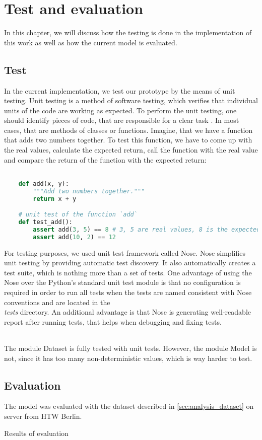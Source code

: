 \chapter{Test and evaluation}
In this chapter, we will discuss how the testing is done
in the implementation of this work as well as how
the current model is evaluated.
\section{Test}
In the current implementation, we test our prototype by the means
of unit testing. Unit testing is a method of software testing,
which verifies that individual units of the code are working
as expected. To perform the unit testing, one should identify
pieces of code, that are responsible for a clear task \cite{Huizinga2007}.
In most cases,
that are methods of classes or functions. Imagine, that we have
a function that adds two numbers together. To test this function,
we have to come up with the real values, calculate the expected
return, call the function with the real value and compare
the return of the function with the expected return:

\begin{lstlisting}[language=Python, caption={TensorFlow example \cite{tensorflow2015-whitepaper}},label={list:test_ex}]

	def add(x, y):
		"""Add two numbers together."""
		return x + y

	# unit test of the function `add`
	def test_add():
		assert add(3, 5) == 8 # 3, 5 are real values, 8 is the expected return
		assert add(10, 2) == 12
\end{lstlisting}

For testing purposes, we
used unit test framework called Nose. Nose simplifies unit testing
by providing automatic test discovery. It also automatically creates a test suite,
which is nothing more than a set of tests. One advantage of using the Nose
over the Python’s standard unit test module is that no configuration is required
in order to run all tests when the tests are named consistent with Nose conventions
and are located in the \emph{\\tests} directory. An additional advantage is that
Nose is generating well-readable report after running tests, that helps
when debugging and fixing tests.
\subparagraph{} The module Dataset is fully tested with unit tests. However,
the module Model is not, since it has too many non-deterministic values, which
is way harder to test.

\section{Evaluation} The model was evaluated with the dataset described
in \autoref{sec:analysis_dataset} on server from HTW Berlin.

Results of evaluation

